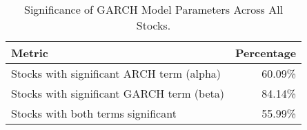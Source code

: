 \begin{table}
\caption{Significance of GARCH Model Parameters Across All Stocks.}
\label{tab:garch_summary}
\begin{tabular}{lr}
\toprule
Metric & Percentage \\
\midrule
Stocks with significant ARCH term (alpha) & 60.09\% \\
Stocks with significant GARCH term (beta) & 84.14\% \\
Stocks with both terms significant & 55.99\% \\
\bottomrule
\end{tabular}
\end{table}
